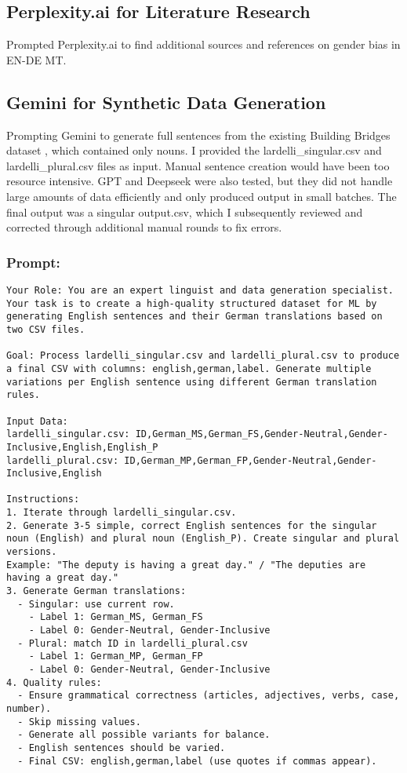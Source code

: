 \begin{appendices}
\subsection{Perplexity.ai for Literature Research}
Prompted Perplexity.ai to find additional sources and references on gender bias in EN-DE MT.



\subsection{Gemini for Synthetic Data Generation}\label{appendix:gemini_prompt}
Prompting Gemini to generate full sentences from the existing Building Bridges dataset \parencite{lardelliBuildingBridgesDataset2024}, which contained only nouns. I provided the lardelli\_singular.csv and lardelli\_plural.csv files as input. Manual sentence creation would have been too resource intensive. GPT and Deepseek were also tested, but they did not handle large amounts of data efficiently and only produced output in small batches. The final output was a singular output.csv, which I subsequently reviewed and corrected through additional manual rounds to fix errors.
\subsubsection{Prompt: } 

\begin{lstlisting}
Your Role: You are an expert linguist and data generation specialist. Your task is to create a high-quality structured dataset for ML by generating English sentences and their German translations based on two CSV files.

Goal: Process lardelli_singular.csv and lardelli_plural.csv to produce a final CSV with columns: english,german,label. Generate multiple variations per English sentence using different German translation rules.

Input Data:
lardelli_singular.csv: ID,German_MS,German_FS,Gender-Neutral,Gender-Inclusive,English,English_P
lardelli_plural.csv: ID,German_MP,German_FP,Gender-Neutral,Gender-Inclusive,English

Instructions:
1. Iterate through lardelli_singular.csv.
2. Generate 3-5 simple, correct English sentences for the singular noun (English) and plural noun (English_P). Create singular and plural versions.
Example: "The deputy is having a great day." / "The deputies are having a great day."
3. Generate German translations:
  - Singular: use current row.
    - Label 1: German_MS, German_FS
    - Label 0: Gender-Neutral, Gender-Inclusive
  - Plural: match ID in lardelli_plural.csv
    - Label 1: German_MP, German_FP
    - Label 0: Gender-Neutral, Gender-Inclusive
4. Quality rules:
  - Ensure grammatical correctness (articles, adjectives, verbs, case, number).
  - Skip missing values.
  - Generate all possible variants for balance.
  - English sentences should be varied.
  - Final CSV: english,german,label (use quotes if commas appear).


\end{lstlisting}
\end{appendices}
